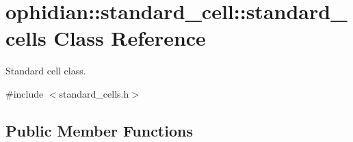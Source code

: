 \hypertarget{classophidian_1_1standard__cell_1_1standard__cells}{\section{ophidian\-:\-:standard\-\_\-cell\-:\-:standard\-\_\-cells Class Reference}
\label{classophidian_1_1standard__cell_1_1standard__cells}
}


Standard cell class.  




{\ttfamily \#include $<$standard\-\_\-cells.\-h$>$}

\subsection*{Public Member Functions}
